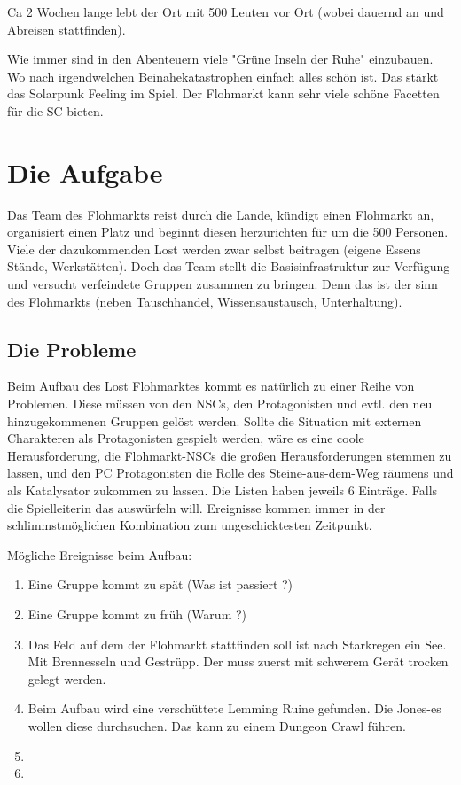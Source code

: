 \documentclass{book}
\begin{document}
Ca 2 Wochen lange lebt der Ort mit 500 Leuten vor Ort (wobei dauernd an und Abreisen stattfinden).

Wie immer sind in den Abenteuern viele "Grüne Inseln der Ruhe" einzubauen. Wo nach irgendwelchen Beinahekatastrophen einfach alles schön ist. Das stärkt das Solarpunk Feeling im Spiel. Der Flohmarkt kann sehr viele schöne Facetten für die SC bieten.


\chapter{Die Aufgabe}

Das Team des Flohmarkts reist durch die Lande, kündigt einen Flohmarkt an, organisiert einen Platz und beginnt diesen herzurichten für um die 500 Personen. Viele der dazukommenden Lost werden zwar selbst beitragen (eigene Essens Stände, Werkstätten).
Doch das Team stellt die Basisinfrastruktur zur Verfügung und versucht verfeindete Gruppen zusammen zu bringen. Denn das ist der sinn des Flohmarkts (neben Tauschhandel, Wissensaustausch, Unterhaltung).

\section{Die Probleme}

Beim Aufbau des Lost Flohmarktes kommt es natürlich zu einer Reihe von Problemen. Diese müssen von den NSCs, den Protagonisten und evtl. den neu hinzugekommenen Gruppen gelöst werden. Sollte die Situation mit externen Charakteren als Protagonisten gespielt werden, wäre es eine coole Herausforderung, die Flohmarkt-NSCs die großen Herausforderungen stemmen zu lassen, und den PC Protagonisten die Rolle des Steine-aus-dem-Weg räumens und als Katalysator zukommen zu lassen. Die Listen haben jeweils 6 Einträge. Falls die Spielleiterin das auswürfeln will. Ereignisse kommen immer in der schlimmstmöglichen Kombination zum ungeschicktesten Zeitpunkt.

Mögliche Ereignisse beim Aufbau:

\begin{enumerate}
\item Eine Gruppe kommt zu spät (Was ist passiert ?)
\item Eine Gruppe kommt zu früh (Warum ?)
\item Das Feld auf dem der Flohmarkt stattfinden soll ist nach Starkregen ein See. Mit Brennesseln und Gestrüpp. Der muss zuerst mit schwerem Gerät trocken gelegt werden.
\item Beim Aufbau wird eine verschüttete Lemming Ruine gefunden. Die Jones-es wollen diese durchsuchen. Das kann zu einem Dungeon Crawl führen.
\item
\item
\end{enumerate}
\end{document}

